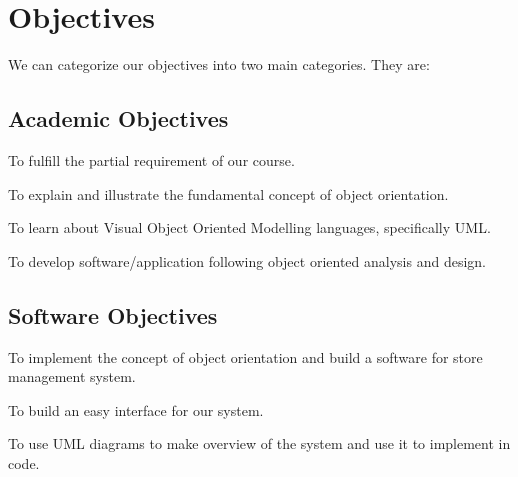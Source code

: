 \section{Objectives}

We can categorize our objectives into two main categories. They are:

\subsection{Academic Objectives}

\begin{itemize*}
  \item To fulfill the partial requirement of our course.
  \item To explain and illustrate the fundamental concept of object
    orientation.
  \item To learn about Visual Object Oriented Modelling languages, 
    specifically UML.
  \item To develop software/application following object oriented 
    analysis and design.
\end{itemize*}


\subsection{Software Objectives}

\begin{itemize*}
  \item To implement the concept of object orientation and build a 
    software for store management system.
  \item To build an easy interface for our system.
  \item To use UML diagrams to make overview of the system and use it 
    to implement in code.
\end{itemize*}
